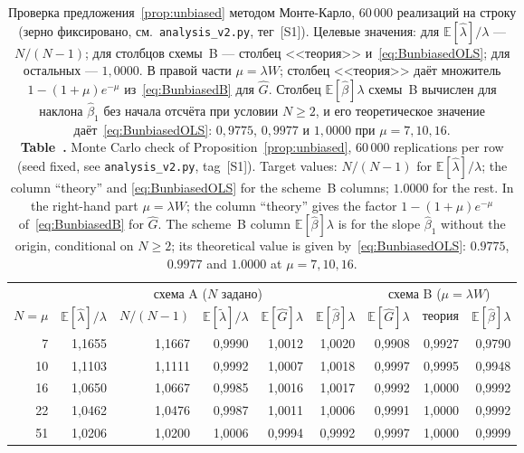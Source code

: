 \documentclass[11pt,a4paper]{article}
\newcommand{\encaptab}[1]{\\[3pt]\foreignlanguage{english}{%
  \textbf{Table~\thetable.} #1}}
\theoremstyle{plain}
\theoremstyle{remark}
\begin{document}
\begin{table}[t]
\centering
\caption{Проверка предложения~\ref{prop:unbiased} методом Монте-Карло,
$60\,000$ реализаций на строку (зерно фиксировано, см.\ \texttt{analysis\_v2.py},
тег~[S1]). Целевые значения: для $\mathbb E[\hat\lambda]/\lambda$ --- $N/(N-1)$; для
столбцов схемы~B --- столбец <<теория>> и~\eqref{eq:BunbiasedOLS}; для остальных ---
$1{,}0000$.
В правой части $\mu=\lambda W$; столбец <<теория>> даёт множитель
$1-(1+\mu)e^{-\mu}$ из~\eqref{eq:BunbiasedB} для $\hat G$. Столбец
$\mathbb E[\hat\beta]\lambda$ схемы~B вычислен для наклона $\hat\beta_1$ без начала
отсчёта при условии $N\ge2$, и его теоретическое значение
даёт~\eqref{eq:BunbiasedOLS}: $0{,}9775$, $0{,}9977$ и $1{,}0000$ при $\mu=7,10,16$.
\encaptab{Monte Carlo check of Proposition~\ref{prop:unbiased}, $60\,000$
replications per row (seed fixed, see \texttt{analysis\_v2.py}, tag~[S1]). Target
values: $N/(N-1)$ for $\mathbb E[\hat\lambda]/\lambda$; the column ``theory'' and
\eqref{eq:BunbiasedOLS} for the scheme~B columns; $1.0000$ for the rest. In the right-hand
part $\mu=\lambda W$; the column ``theory'' gives the factor
$1-(1+\mu)e^{-\mu}$ of~\eqref{eq:BunbiasedB} for $\hat G$. The scheme~B column
$\mathbb E[\hat\beta]\lambda$ is for the slope $\hat\beta_1$ without the origin,
conditional on $N\ge2$; its theoretical value is given
by~\eqref{eq:BunbiasedOLS}: $0.9775$, $0.9977$ and $1.0000$ at $\mu=7,10,16$.}}
\label{tab:mc}
\small
\begin{tabular}{rrrrrr@{\qquad}rrr}
\toprule
& \multicolumn{5}{c}{схема A ($N$ задано)} & \multicolumn{3}{c}{схема B ($\mu=\lambda W$)}\\
\cmidrule(r){2-6}\cmidrule(l){7-9}
$N=\mu$ & $\mathbb E[\hat\lambda]/\lambda$ & $N/(N-1)$
& $\mathbb E[\tilde\lambda]/\lambda$ & $\mathbb E[\hat G]\lambda$
& $\mathbb E[\hat\beta]\lambda$
& $\mathbb E[\hat G]\lambda$ & теория & $\mathbb E[\hat\beta]\lambda$\\
\midrule
7 & 1{,}1655 & 1{,}1667 & 0{,}9990 & 1{,}0012 & 1{,}0020 & 0{,}9908 & 0{,}9927 & 0{,}9790\\
10 & 1{,}1103 & 1{,}1111 & 0{,}9992 & 1{,}0007 & 1{,}0018 & 0{,}9997 & 0{,}9995 & 0{,}9948\\
16 & 1{,}0650 & 1{,}0667 & 0{,}9985 & 1{,}0016 & 1{,}0017 & 0{,}9992 & 1{,}0000 & 0{,}9992\\
22 & 1{,}0462 & 1{,}0476 & 0{,}9987 & 1{,}0011 & 1{,}0006 & 0{,}9991 & 1{,}0000 & 0{,}9992\\
51 & 1{,}0206 & 1{,}0200 & 1{,}0006 & 0{,}9994 & 0{,}9992 & 0{,}9997 & 1{,}0000 & 0{,}9999\\
\bottomrule
\end{tabular}
\end{table}
\end{document}
